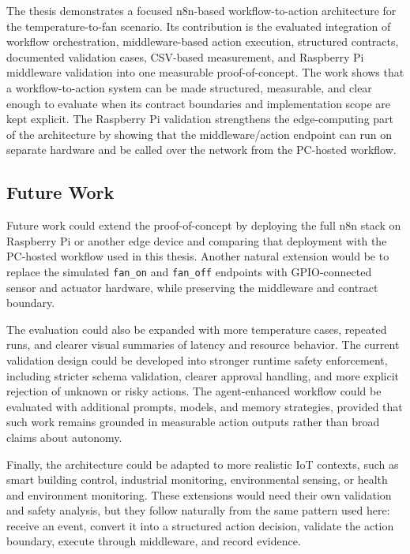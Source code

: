 The thesis demonstrates a focused n8n-based workflow-to-action architecture for the temperature-to-fan scenario. Its contribution is the evaluated integration of workflow orchestration, middleware-based action execution, structured contracts, documented validation cases, CSV-based measurement, and Raspberry Pi middleware validation into one measurable proof-of-concept.
The work shows that a workflow-to-action system can be made structured, measurable, and clear enough to evaluate when its contract boundaries and implementation scope are kept explicit. The Raspberry Pi validation strengthens the edge-computing part of the architecture by showing that the middleware/action endpoint can run on separate hardware and be called over the network from the PC-hosted workflow.



\subsection{Future Work}\label{subsec:future-work}

Future work could extend the proof-of-concept by deploying the full n8n stack on Raspberry Pi or another edge device and comparing that deployment with the PC-hosted workflow used in this thesis. Another natural extension would be to replace the simulated \texttt{fan\_on} and \texttt{fan\_off} endpoints with GPIO-connected sensor and actuator hardware, while preserving the middleware and contract boundary.

The evaluation could also be expanded with more temperature cases, repeated runs, and clearer visual summaries of latency and resource behavior. The current validation design could be developed into stronger runtime safety enforcement, including stricter schema validation, clearer approval handling, and more explicit rejection of unknown or risky actions. The agent-enhanced workflow could be evaluated with additional prompts, models, and memory strategies, provided that such work remains grounded in measurable action outputs rather than broad claims about autonomy.

Finally, the architecture could be adapted to more realistic IoT contexts, such as smart building control, industrial monitoring, environmental sensing, or health and environment monitoring. These extensions would need their own validation and safety analysis, but they follow naturally from the same pattern used here: receive an event, convert it into a structured action decision, validate the action boundary, execute through middleware, and record evidence.
